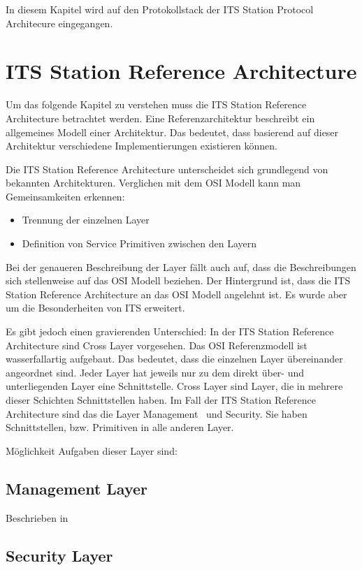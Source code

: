 In diesem Kapitel wird auf den Protokollstack der \ac{ITS} Station Protocol Architecure eingegangen.

\section{ITS Station Reference Architecture}
Um das folgende Kapitel zu verstehen muss die \ac{ITS} Station Reference Architecture betrachtet werden. Eine Referenzarchitektur beschreibt ein allgemeines Modell einer Architektur. Das bedeutet, dass basierend auf dieser Architektur verschiedene Implementierungen existieren können. 

Die \ac{ITS} Station Reference Architecture unterscheidet sich grundlegend von bekannten Architekturen. Verglichen mit dem \ac{OSI} Modell kann man Gemeinsamkeiten erkennen:
\begin{itemize}
	\item Trennung der einzelnen Layer
	\item Definition von Service Primitiven zwischen den Layern
\end{itemize}

Bei der genaueren Beschreibung der Layer fällt auch auf, dass die Beschreibungen sich stellenweise auf das \ac{OSI} Modell beziehen. Der Hintergrund ist, dass die \ac{ITS} Station Reference Architecture an das \ac{OSI} Modell angelehnt ist. Es wurde aber um die Besonderheiten von \ac{ITS} erweitert.

Es gibt jedoch einen gravierenden Unterschied: In der \ac{ITS} Station Reference Architecture sind Cross Layer vorgesehen. Das \ac{OSI} Referenzmodell ist wasserfallartig aufgebaut. Das bedeutet, dass die einzelnen Layer übereinander angeordnet sind. Jeder Layer hat jeweils nur zu dem direkt über- und unterliegenden Layer eine Schnittstelle. Cross Layer sind Layer, die in mehrere dieser Schichten Schnittstellen haben. Im Fall der \ac{ITS} Station Reference Architecture sind das die Layer \glqq Management\grqq~ und \glqq Security\grqq. Sie haben Schnittstellen, bzw. Primitiven in alle anderen Layer. 

Möglichkeit Aufgaben dieser Layer sind:
\subsection{Management Layer}
Beschrieben in \cite{etsi1027232}

\subsection{Security Layer}

